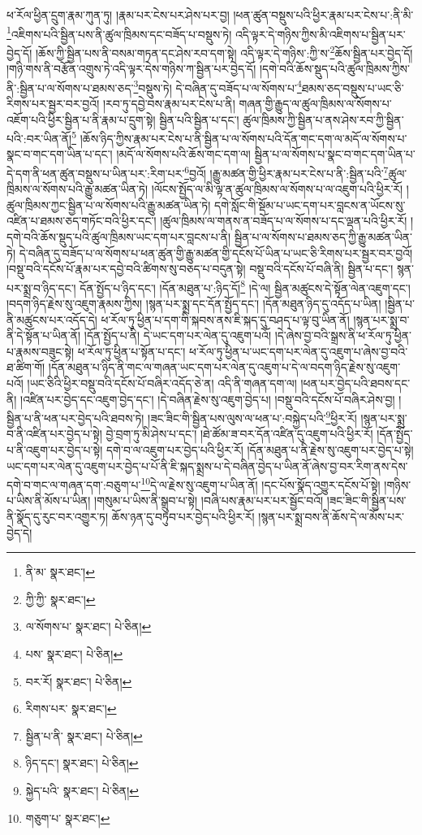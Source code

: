 ཕ་རོལ་ཕྱིན་དྲུག་རྣམ་ཀུན་ཏུ། །རྣམ་པར་ངེས་པར་ཤེས་པར་བྱ། །ཕན་ཚུན་བསྡུས་པའི་ཕྱིར་རྣམ་པར་ངེས་པ་:ནི་མི་\footnote{ནི་མ་  སྣར་ཐང་། }འཇིགས་པའི་སྦྱིན་པས་ནི་ཚུལ་ཁྲིམས་དང་བཟོད་པ་བསྡུས་ཏེ། འདི་ལྟར་དེ་གཉིས་ཀྱིས་མི་འཇིགས་པ་སྦྱིན་པར་བྱེད་དོ། །ཆོས་ཀྱི་སྦྱིན་པས་ནི་བསམ་གཏན་དང་ཤེས་རབ་དག་སྟེ། འདི་ལྟར་དེ་གཉིས་:ཀྱི་ས་\footnote{ཀྱི་ཀྱི་  སྣར་ཐང་། }ཆོས་སྦྱིན་པར་བྱེད་དོ། །གཉི་གས་ནི་བརྩོན་འགྲུས་ཏེ་འདི་ལྟར་དེས་གཉིས་ཀ་སྦྱིན་པར་བྱེད་དོ། །དགེ་བའི་ཆོས་སྡུད་པའི་ཚུལ་ཁྲིམས་ཀྱིས་ནི་:སྦྱིན་པ་ལ་སོགས་པ་ཐམས་ཅད་\footnote{ལ་སོགས་པ་  སྣར་ཐང་།  པེ་ཅིན། }བསྡུས་ཏེ། དེ་བཞིན་དུ་བཟོད་པ་ལ་སོགས་པ་\footnote{པས་  སྣར་ཐང་།  པེ་ཅིན། }ཐམས་ཅད་བསྡུས་པ་ཡང་ཅི་རིགས་པར་སྦྱར་བར་བྱའོ། །རབ་ཏུ་དབྱེ་བས་རྣམ་པར་ངེས་པ་ནི། གཞན་གྱི་རྒྱུད་ལ་ཚུལ་ཁྲིམས་ལ་སོགས་པ་འཇོག་པའི་ཕྱིར་སྦྱིན་པ་ནི་རྣམ་པ་དྲུག་སྟེ། སྦྱིན་པའི་སྦྱིན་པ་དང་། ཚུལ་ཁྲིམས་ཀྱི་སྦྱིན་པ་ནས་ཤེས་རབ་ཀྱི་སྦྱིན་པའི་:བར་ཡིན་ནོ།\footnote{བར་རོ།  སྣར་ཐང་།  པེ་ཅིན། } །ཆོས་ཉིད་ཀྱིས་རྣམ་པར་ངེས་པ་ནི་སྦྱིན་པ་ལ་སོགས་པའི་དོན་གང་དག་ལ་མདོ་ལ་སོགས་པ་སྣང་བ་གང་དག་ཡིན་པ་དང་། །མདོ་ལ་སོགས་པའི་ཆོས་གང་དག་ལ། སྦྱིན་པ་ལ་སོགས་པ་སྣང་བ་གང་དག་ཡིན་པ་དེ་དག་ནི་ཕན་ཚུན་བསྡུས་པ་ཡིན་པར་:རིག་པར་\footnote{རིགས་པར་  སྣར་ཐང་། }བྱའོ། །རྒྱུ་མཚན་གྱི་ཕྱིར་རྣམ་པར་ངེས་པ་ནི་:སྦྱིན་པའི་\footnote{སྦྱིན་པ་ནི་  སྣར་ཐང་།  པེ་ཅིན། }ཚུལ་ཁྲིམས་ལ་སོགས་པའི་རྒྱུ་མཚན་ཡིན་ཏེ། །ལོངས་སྤྱོད་ལ་མི་ལྟ་ན་ཚུལ་ཁྲིམས་ལ་སོགས་པ་ལ་འཇུག་པའི་ཕྱིར་རོ། །ཚུལ་ཁྲིམས་ཀྱང་སྦྱིན་པ་ལ་སོགས་པའི་རྒྱུ་མཚན་ཡིན་ཏེ། དགེ་སློང་གི་སྡོམ་པ་ཡང་དག་པར་བླངས་ན་ཡོངས་སུ་འཛིན་པ་ཐམས་ཅད་གཏོང་བའི་ཕྱིར་དང་། །ཚུལ་ཁྲིམས་ལ་གནས་ན་བཟོད་པ་ལ་སོགས་པ་དང་ལྡན་པའི་ཕྱིར་རོ། །དགེ་བའི་ཆོས་སྡུད་པའི་ཚུལ་ཁྲིམས་ཡང་དག་པར་བླངས་པ་ནི། སྦྱིན་པ་ལ་སོགས་པ་ཐམས་ཅད་ཀྱི་རྒྱུ་མཚན་ཡིན་ཏེ། དེ་བཞིན་དུ་བཟོད་པ་ལ་སོགས་པ་ཕན་ཚུན་གྱི་རྒྱུ་མཚན་གྱི་དངོས་པོ་ཡིན་པ་ཡང་ཅི་རིགས་པར་སྦྱར་བར་བྱའོ། །བསྡུ་བའི་དངོས་པོ་རྣམ་པར་དབྱེ་བའི་ཚིགས་སུ་བཅད་པ་བདུན་སྟེ། བསྡུ་བའི་དངོས་པོ་བཞི་ནི། སྦྱིན་པ་དང་། སྙན་པར་སྨྲ་བ་ཉིད་དང་། དོན་སྤྱོད་པ་ཉིད་དང་། །དོན་མཐུན་པ་:ཉིད་དོ།\footnote{ཉིད་དང་།  སྣར་ཐང་།  པེ་ཅིན། } །དེ་ལ། སྦྱིན་མཚུངས་དེ་སྟོན་ལེན་འཇུག་དང་། །བདག་ཉིད་རྗེས་སུ་འཇུག་རྣམས་ཀྱིས། །སྙན་པར་སྨྲ་དང་དོན་སྤྱོད་དང་། །དོན་མཐུན་ཉིད་དུ་འདོད་པ་ཡིན། །སྦྱིན་པ་ནི་མཚུངས་པར་འདོད་དེ། ཕ་རོལ་ཏུ་ཕྱིན་པ་དག་གི་སྐབས་ནས་ཇི་སྐད་དུ་བཤད་པ་ལྟ་བུ་ཡིན་ནོ། །སྙན་པར་སྨྲ་བ་ནི་དེ་སྟོན་པ་ཡིན་ནོ། །དོན་སྤྱོད་པ་ནི། དེ་ཡང་དག་པར་ལེན་དུ་འཇུག་པའོ། །དེ་ཞེས་བྱ་བའི་སྒྲས་ནི་ཕ་རོལ་ཏུ་ཕྱིན་པ་རྣམས་བཟུང་སྟེ། ཕ་རོལ་ཏུ་ཕྱིན་པ་སྟོན་པ་དང་། ཕ་རོལ་ཏུ་ཕྱིན་པ་ཡང་དག་པར་ལེན་དུ་འཇུག་པ་ཞེས་བྱ་བའི་ཐ་ཚིག་གོ། །དོན་མཐུན་པ་ཉིད་ནི་གང་ལ་གཞན་ཡང་དག་པར་ལེན་དུ་འཇུག་པ་དེ་ལ་བདག་ཉིད་རྗེས་སུ་འཇུག་པའོ། །ཡང་ཅིའི་ཕྱིར་བསྡུ་བའི་དངོས་པོ་བཞིར་འདོད་ཅེ་ན། འདི་ནི་གཞན་དག་ལ། །ཕན་པར་བྱེད་པའི་ཐབས་དང་ནི། །འཛིན་པར་བྱེད་དང་འཇུག་བྱེད་དང་། །དེ་བཞིན་རྗེས་སུ་འཇུག་བྱེད་པ། །བསྡུ་བའི་དངོས་པོ་བཞིར་ཤེས་བྱ། །སྦྱིན་པ་ནི་ཕན་པར་བྱེད་པའི་ཐབས་ཏེ། །ཟང་ཟིང་གི་སྦྱིན་པས་ལུས་ལ་ཕན་པ་:བསྐྱེད་པའི་\footnote{སྐྱེད་པའི་  སྣར་ཐང་།  པེ་ཅིན། }ཕྱིར་རོ། །སྙན་པར་སྨྲ་བ་ནི་འཛིན་པར་བྱེད་པ་སྟེ། བྱེ་བྲག་ཏུ་མི་ཤེས་པ་དང་། །ཐེ་ཚོམ་ཟ་བར་དོན་འཛིན་དུ་འཇུག་པའི་ཕྱིར་རོ། །དོན་སྤྱོད་པ་ནི་འཇུག་པར་བྱེད་པ་སྟེ། དགེ་བ་ལ་འཇུག་པར་བྱེད་པའི་ཕྱིར་རོ། །དོན་མཐུན་པ་ནི་རྗེས་སུ་འཇུག་པར་བྱེད་པ་སྟེ། ཡང་དག་པར་ལེན་དུ་འཇུག་པར་བྱེད་པ་པོ་ནི་ཇི་སྐད་སྨྲས་པ་དེ་བཞིན་བྱེད་པ་ཡིན་ནོ་ཞེས་བྱ་བར་རིག་ནས་དེས་དགེ་བ་གང་ལ་གཞན་དག་:བཅུག་པ་\footnote{གཅུག་པ་  སྣར་ཐང་། }དེ་ལ་རྗེས་སུ་འཇུག་པ་ཡིན་ནོ། །དང་པོས་སྣོད་འགྱུར་དངོས་པོ་སྟེ། །གཉིས་པ་ཡིས་ནི་མོས་པ་ཡིན། །གསུམ་པ་ཡིས་ནི་སྒྲུབ་པ་སྟེ། །བཞི་པས་རྣམ་པར་པར་སྦྱོང་བའོ། །ཟང་ཟིང་གི་སྦྱིན་པས་ནི་སྣོད་དུ་རུང་བར་འགྱུར་ཏ། ཆོས་ཉན་དུ་བཏུབ་པར་བྱེད་པའི་ཕྱིར་རོ། །སྙན་པར་སྨྲ་བས་ནི་ཆོས་དེ་ལ་མོས་པར་བྱེད་དེ། 